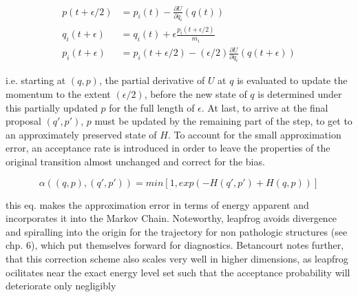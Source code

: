 \documentclass[11pt]{article}
\begin{document}
        \begin{align} \label{leapfrog}
            p(t + \epsilon/2) &= p_i(t) -\frac{\partial U}{\partial q_i} (q(t)) \\
           q_i(t+\epsilon) &= q_i(t) + \epsilon\frac{p_i(t+ \epsilon/2)}{m_i} \label{leapQupdate} \\
           p_i(t+\epsilon) &= p_i(t+ \epsilon/2) - (\epsilon/2) \frac{\partial U}{\partial q_i} (q(t +\epsilon))
        \end{align}

        i.e. starting at $(q,p)$, the partial derivative of $U$ at $q$ is evaluated to update the momentum to the extent $(\epsilon/2)$, before the new state of $q$ is determined under this partially updated $p$ for the full length of $\epsilon$. At last, to arrive at the final proposal $(q', p')$, $p$ must be updated by the remaining part of the step, to get to an approximately preserved state of $H$.
        To account for the small approximation error, an acceptance rate is introduced in order to leave the properties of the original transition almost unchanged and correct for the bias.

        \begin{equation} \label{hmcaccept}
            \alpha((q,p),(q', p')) = min\left[1, exp(-H(q',p') + H(q,p))\right]
        \end{equation}

        this eq. makes the approximation error in terms of energy apparent and incorporates it into the Markov Chain.
        Noteworthy, leapfrog avoids divergence  and spiralling into the origin for the trajectory for non pathologic structures (see \cite{betancourt2017conceptual} chp. 6), which put themselves forward for diagnostics. Betancourt notes further, that this correction scheme also scales very well in higher dimensions, as leapfrog ocilitates near the exact energy level set such that the acceptance probability will deteriorate only negligibly %



\end{document}
